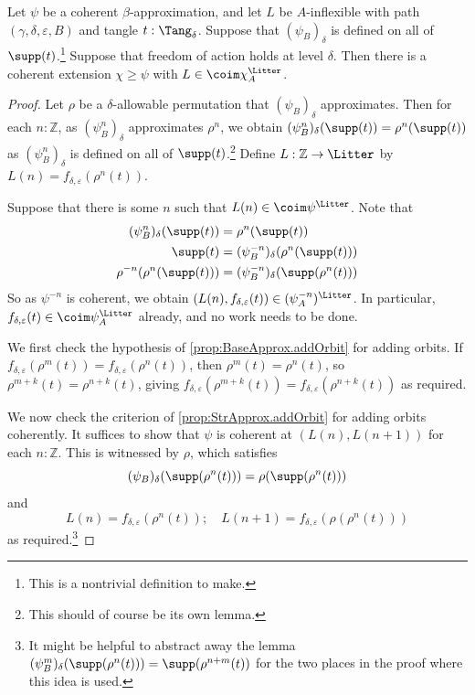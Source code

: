\begin{proposition}
  \label{prop:StrApprox.addInflexible}
  Let \( \psi \) be a coherent \( \beta \)-approximation, and let \( L \) be \( A \)-inflexible with path \( (\gamma, \delta, \varepsilon, B) \) and tangle \( t : \Tang_\delta \).
  Suppose that \( (\psi_B)_\delta \) is defined on all of \( \supp(t) \).\footnote{This is a nontrivial definition to make.}
  Suppose that freedom of action holds at level \( \delta \).
  Then there is a coherent extension \( \chi \geq \psi \) with \( L \in \coim \chi_A^\Litter \).
\end{proposition}
\begin{proof}
  Let \( \rho \) be a \( \delta \)-allowable permutation that \( (\psi_B)_\delta \) approximates.
  Then for each \( n : \mathbb Z \), as \( (\psi^n_B)_\delta \) approximates \( \rho^n \), we obtain \( (\psi^n_B)_\delta(\supp(t)) = \rho^n(\supp(t)) \) as \( (\psi^n_B)_\delta \) is defined on all of \( \supp(t) \).\footnote{This should of course be its own lemma.}
  Define \( L : \mathbb Z \to \Litter \) by \( L(n) = f_{\delta,\varepsilon}(\rho^n(t)) \).

  Suppose that there is some \( n \) such that \( L(n) \in \coim \psi^\Litter \).
  Note that
  \begin{align*}
    (\psi^n_B)_\delta(\supp(t)) &= \rho^n(\supp(t)) \\
    \supp(t) &= (\psi^{-n}_B)_\delta(\rho^n(\supp(t))) \\
    \rho^{-n}(\rho^n(\supp(t))) &= (\psi^{-n}_B)_\delta(\supp(\rho^n(t)))
  \end{align*}
  So as \( \psi^{-n} \) is coherent, we obtain \( (L(n), f_{\delta,\varepsilon}(t)) \in (\psi^{-n}_A)^\Litter \).
  In particular, \( f_{\delta,\varepsilon}(t) \in \coim \psi_A^\Litter \) already, and no work needs to be done.

  We first check the hypothesis of \cref{prop:BaseApprox.addOrbit} for adding orbits.
  If \( f_{\delta,\varepsilon}(\rho^m(t)) = f_{\delta,\varepsilon}(\rho^n(t)) \), then \( \rho^m(t) = \rho^n(t) \), so \( \rho^{m+k}(t) = \rho^{n+k}(t) \), giving \( f_{\delta,\varepsilon}(\rho^{m+k}(t)) = f_{\delta,\varepsilon}(\rho^{n+k}(t)) \) as required.

  We now check the criterion of \cref{prop:StrApprox.addOrbit} for adding orbits coherently.
  It suffices to show that \( \psi \) is coherent at \( (L(n), L(n+1)) \) for each \( n : \mathbb Z \).
  This is witnessed by \( \rho \), which satisfies
  \[ (\psi_B)_\delta(\supp(\rho^n(t))) = \rho(\supp(\rho^n(t))) \]
  and
  \[ L(n) = f_{\delta,\varepsilon}(\rho^n(t));\quad L(n+1) = f_{\delta,\varepsilon}(\rho(\rho^n(t))) \]
  as required.\footnote{It might be helpful to abstract away the lemma \( (\psi^m_B)_\delta(\supp(\rho^n(t))) = \supp(\rho^{n+m}(t)) \) for the two places in the proof where this idea is used.}
\end{proof}
